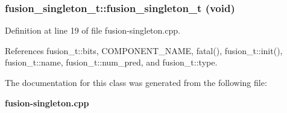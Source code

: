\subsubsection[{fusion\_\-singleton\_\-t}]{\setlength{\rightskip}{0pt plus 5cm}fusion\_\-singleton\_\-t::fusion\_\-singleton\_\-t (void)\hspace{0.3cm}{\tt  [inline]}}\label{classfusion__singleton__t_1cddc9acd3ec6f4237eea314bb153cb5}




Definition at line 19 of file fusion-singleton.cpp.

References fusion\_\-t::bits, COMPONENT\_\-NAME, fatal(), fusion\_\-t::init(), fusion\_\-t::name, fusion\_\-t::num\_\-pred, and fusion\_\-t::type.

The documentation for this class was generated from the following file:\begin{CompactItemize}
\item 
{\bf fusion-singleton.cpp}\end{CompactItemize}
